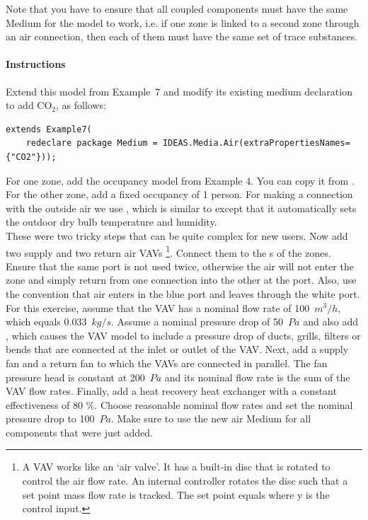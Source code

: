 \documentclass[10pt,a4paper]{article}
\begin{document}
Note that you have to ensure that all coupled components must have the same Medium
for the model to work, i.e. if one zone is linked to a second zone through an air connection,
then each of them must have the same set of trace substances.

\newpage

\paragraph{Instructions}
Extend this model from Example~7 and modify its existing medium declaration
to add CO$_2$, as follows:
\begin{verbatim}
extends Example7(
    redeclare package Medium = IDEAS.Media.Air(extraPropertiesNames={"CO2"}));
\end{verbatim}
For one zone, add the occupancy model from Example 4. 
You can copy it from .
For the other zone, add a fixed occupancy of 1 person. For making a connection with the outside air we use ,
which is similar to  except that it 
automatically sets the outdoor dry bulb temperature and humidity. \\

These were two tricky steps that can be quite complex for new users. 
Now add two supply and two return air VAVs
\footnote{A VAV works like an `air valve'. It has a built-in disc that is rotated to control the 
air flow rate. An internal controller rotates the disc such that a set point mass flow rate is tracked.
The set point equals  where y is the control input.}.
Connect them to the s of the zones. 
Ensure that the same port is not used twice, otherwise
the air will not enter the zone and simply return from one 
connection into the other at the port.
Also, use the convention that air enters in the blue port and leaves
through the white port.
For this exercise, assume that the VAV has a nominal flow rate of 100~$m^3/h$,
which equals 0.033~$kg/s$.
Assume a nominal pressure drop of 50~$Pa$ and
also add , which causes the VAV
model to include a pressure drop of ducts, grills, filters or bends that are connected
at the inlet or outlet of the VAV. Next, add a supply fan and a return fan to which the VAVs
are connected in parallel. The fan pressure head is constant at 200~$Pa$
and its nominal flow rate is the sum of the VAV flow rates.
Finally, add a heat recovery heat exchanger with a constant effectiveness of 80 \%.
Choose reasonable nominal flow rates and set the nominal pressure drop to 100~$Pa$.
Make sure to use the new air Medium for all components that were just added.\\
\end{document}
